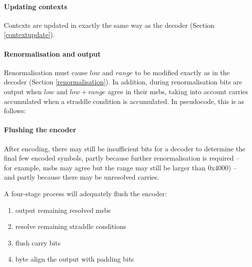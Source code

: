 \begin{informative*}
\paragraph*{Updating contexts\\}
Contexts are updated in exactly the same way as the 
decoder (Section \ref{contextupdate}).


\paragraph*{Renormalisation and output\\}
Renormalisation must cause $low$ and $range$ to be modified exactly
as in the decoder (Section \ref{renormalisation}). In addition, 
during renormalisation bits are output when $low$ and $low+range$ 
agree in their msbs, taking into account carries accumulated when a
straddle condition is accumulated. 
In pseudocode, this is as follows:

\begin{pseudo*}
    \bsELSE
        \bsEND
    \bsEND
\bsEND
\end{pseudo*}

\paragraph*{Flushing the encoder\\}
After encoding, there may still be insufficient bits for a decoder
to determine the final few encoded symbols, partly because further 
renormalisation is required -- for example, msbs may agree but the range
may still be larger than 0x4000) -- and partly because there may be 
unresolved carries.

A four-stage process will adequately flush the encoder:
\begin{enumerate}
\item{output remaining resolved msbs}
\item{resolve remaining straddle conditions}
\item{flush carry bits}
\item{byte align the output with padding bits}
\end{enumerate}


\end{informative*}
